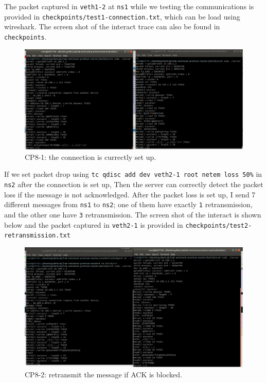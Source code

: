 \documentclass[11pt]{article}
\begin{document}
	\par The packet captured in \texttt{veth1-2} at \texttt{ns1} while we testing the communications is provided in \texttt{checkpoints/test1-connection.txt}, which can be load using wireshark. The screen shot of the interact trace can also be found in \texttt{checkpoints}.
	
	\begin{figure}[htbp]
		\centering
		\includegraphics[width=0.9\linewidth]{../lab-netstack-premium-master/checkpoints/test1-connection.png}
		\caption{CP8-1: the connection is currectly set up.}
		\label{fig:CP8-1}
	\end{figure}
	
	\par If we set packet drop using \texttt{tc qdisc add dev veth2-1 root netem loss 50\%} in \texttt{ns2} after the connection is set up, Then the server can correctly detect the packet loss if the message is not acknowledged. After the packet loss is set up, I send 7 different messages from \texttt{ns1} to \texttt{ns2}; one of them have exactly \texttt{1} retransmission, and the other one have \texttt{3} retransmission. The screen shot of the interact is shown below and the packet captured in \texttt{veth2-1} is provided in \texttt{checkpoints/test2-retransmission.txt}
	
	\begin{figure}[htbp]
		\centering
		\includegraphics[width=0.9\linewidth]{../lab-netstack-premium-master/checkpoints/test2-retransmission.png}
		\caption{CP8-2: retransmit the message if ACK is blocked.}
		\label{fig:CP8-2}
	\end{figure}
	
\end{document}
